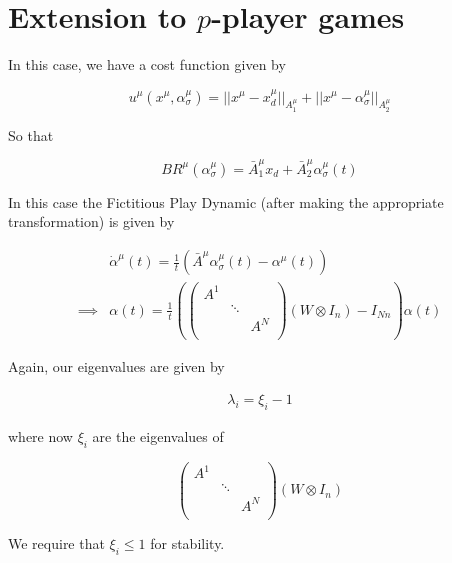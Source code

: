 \documentclass[preprint,12pt]{article}
\theoremstyle{definition}
\theoremstyle{theorem}
\theoremstyle{remark}
\theoremstyle{example}
\newcommand{\xmu}{x^\mu}
\begin{document}
	 \section{Extension to $p$-player games}
	
	In this case, we have a cost function given by
	
	\begin{equation}
		u^\mu(x^\mu, \alpha_\sigma^\mu) = ||\xmu - \xmu_d||_{A^\mu_1} + ||\xmu - \alpha_\sigma^\mu||_{A^\mu_2}
	\end{equation}

	So that
	
	\begin{equation}
		BR^\mu(\alpha_\sigma^\mu) = \bar{A}^\mu_1 x_d + \bar{A}^\mu_2 \alpha_\sigma^\mu(t)
	\end{equation}
	
	In this case the Fictitious Play Dynamic (after making the appropriate transformation) is given by 
	
	\begin{align*}
		& \dot{\alpha}^\mu(t) = \frac{1}{t} \left( \bar{A}^\mu \alpha_\sigma^\mu(t) - \alpha^\mu(t) \right) \\
		\implies & \alpha(t) = \frac{1}{t} \left( \begin{pmatrix}
			A^1 & & \\
			& \ddots & \\
			 & & A^N \\
		\end{pmatrix} (W \otimes I_n ) - I_{Nn} \right) \alpha(t)
	\end{align*}

	Again, our eigenvalues are given by
	
	\begin{align*}
		\lambda_i = \xi_i - 1
	\end{align*}
	
	where now $\xi_i$ are the eigenvalues of 
	
	\begin{equation}
		 \begin{pmatrix}
			A^1 & & \\
			& \ddots & \\
			& & A^N \\
		\end{pmatrix} (W \otimes I_n )
	\end{equation}
	
	We require that $\xi_i \leq 1$ for stability.
 	
\end{document}
